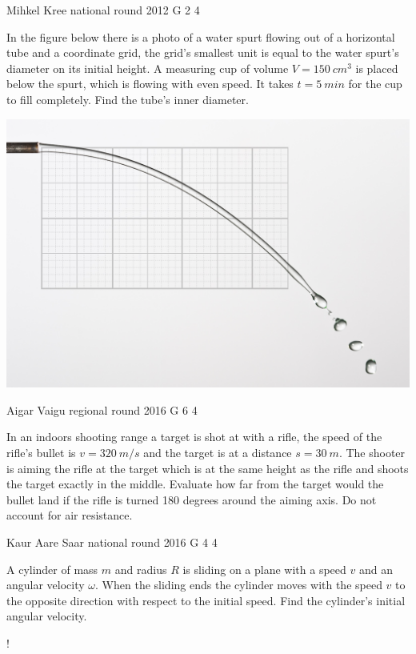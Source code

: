 \documentclass[11pt]{article}
\begin{document}
{Mihkel Kree} %
{national round} %
{2012} %
{G 2} %
{4} %
{

\ifEngStatement
In the figure below there is a photo of a water spurt flowing out of a horizontal tube and a coordinate grid, the grid’s smallest unit is equal to the water spurt’s diameter on its initial height. A measuring cup of volume $V=\SI{150}{cm^3}$ is placed below the spurt, which is flowing with even speed.  It takes $t=\SI{5}{min}$ for the cup to fill completely. Find the tube’s inner diameter.
\begin{center}
\includegraphics[width=0.7\linewidth]{2012-v3g-02-jet}%
\end{center}
\fi
}

{Aigar Vaigu} %
{regional round} %
{2016} %
{G 6} %
{4} %
{

\ifEngStatement
In an indoors shooting range a target is shot at with a rifle, the speed of the rifle’s bullet is $v=\SI{320}{m/s}$ and the target is at a distance $s=\SI{30}{m}$. The shooter is aiming the rifle at the target which is at the same height as the rifle and shoots the target exactly in the middle. Evaluate how far from the target would the bullet land if the rifle is turned 180 degrees around the aiming axis. Do not account for air resistance.
\fi
}

{Kaur Aare Saar} %
{national round} %
{2016} %
{G 4} %
{4} %
{

\ifEngStatement
A cylinder of mass $m$ and radius $R$ is sliding on a plane with a speed $v$ and an angular velocity $\omega$. When the sliding ends the cylinder moves with the speed $v$ to the opposite direction with respect to the initial speed. Find the cylinder’s initial angular velocity.
\begin{center}
	\begin{resizebox}{0.35\linewidth}{!}{
			}
	\end{resizebox}
\end{center}
\fi
}
\end{document}
